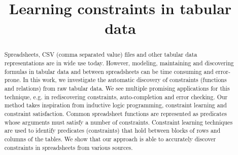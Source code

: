 \documentclass{IEEEtran}
\theoremstyle{definition}
\begin{document}
\title{Learning constraints in tabular data}


\maketitle

\begin{abstract}
Spreadsheets, CSV (comma separated value) files and other tabular data representations are in wide use today. However, modeling, maintaining and discovering formulas in tabular data and between spreadsheets can be time consuming and error-prone. In this work, we investigate the automatic discovery of constraints (functions and relations) from raw tabular data. We see multiple promising applications for this technique, e.g. in rediscovering constraints, auto-completion and error checking. Our method takes inspiration from inductive logic programming, constraint learning and constraint satisfaction. Common spreadsheet functions are represented as predicates whose arguments must satisfy a number of constraints. Constraint learning techniques are used to identify predicates (constraints) that hold between blocks of rows and columns of the tables. %
We show that our approach is able to accurately discover constraints in spreadsheets from various sources.
\end{abstract}
\end{document}
